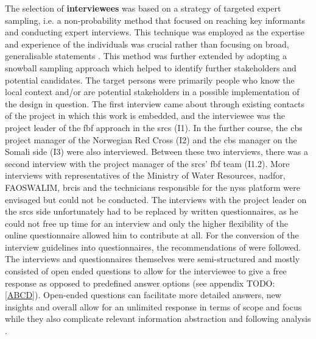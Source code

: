 The selection of \textbf{interviewees} was based on a strategy of targeted expert sampling, i.e. a non-probability method that focused on reaching key informants and conducting expert interviews. This technique was employed as the expertise and experience of the individuals was crucial rather than focusing on broad, generalisable statements \autocite{pelzResearchMethodsSocial}. This method was further extended by adopting a snowball sampling approach which helped to identify further stakeholders and potential candidates.\newline
The target persons were primarily people who know the local context and/or are potential stakeholders in a possible implementation of the design in question. The first interview came about through existing contacts of the project in which this work is embedded, and the interviewee was the project leader of the \acrshort{fbf} approach in the \acrshort{srcs} (I1). In the further course, the \acrshort{cbs} project manager of the Norwegian Red Cross (I2) and the \acrshort{cbs} manager on the Somali side (I3) were also interviewed. Between these two interviews, there was a second interview with the project manager of the \acrshort{srcs}' \acrshort{fbf} team (I1.2). More interviews with representatives of the Ministry of Water Resources, \acrshort{nadfor}, FAOSWALIM, \acrshort{brcis} and the technicians responsible for the \acrshort{nyss} platform were envisaged but could not be conducted. The interviews with the project leader on the \acrshort{srcs} side unfortunately had to be replaced by written questionnaires, as he could not free up time for an interview and only the higher flexibility of the online questionnaire allowed him to contribute at all. For the conversion of the interview guidelines into questionnaires, the recommendations of \autocite{harknessCCSGQuestionnaireDesign2016} were followed. The interviews and questionnaires themselves were semi-structured and mostly consisted of open ended questions to allow for the interviewee to give a free response as opposed to predefined answer options (see appendix TODO: \ref{ABCD}). Open-ended questions can facilitate more detailed answers, new insights and overall allow for an unlimited response in terms of scope and focus while they also complicate relevant information abstraction and following analysis \autocite{pelzResearchMethodsSocial}.\newline
